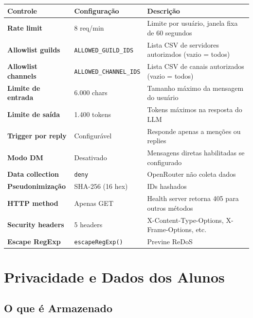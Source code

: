 \documentclass[11pt,a4paper]{article}
\begin{document}
\begin{longtable}{>{\bfseries\color{primary}}l l X}
\toprule
\rowcolor{tableheader}
\color{tableheadertext}\textbf{Controle} & \color{tableheadertext}\textbf{Configura\c{c}\~ao} & \color{tableheadertext}\textbf{Descri\c{c}\~ao} \\
\midrule
\endhead
\rowcolor{tableroweven}
Rate limit & 8 req/min & Limite por usu\'ario, janela fixa de 60 segundos \\
Allowlist guilds & \texttt{ALLOWED\_GUILD\_IDS} & Lista CSV de servidores autorizados (vazio = todos) \\
\rowcolor{tableroweven}
Allowlist channels & \texttt{ALLOWED\_CHANNEL\_IDS} & Lista CSV de canais autorizados (vazio = todos) \\
Limite de entrada & 6.000 chars & Tamanho m\'aximo da mensagem do usu\'ario \\
\rowcolor{tableroweven}
Limite de sa\'ida & 1.400 tokens & Tokens m\'aximos na resposta do LLM \\
Trigger por reply & Configur\'avel & Responde apenas a men\c{c}\~oes ou replies \\
\rowcolor{tableroweven}
Modo DM & Desativado & Mensagens diretas habilitadas se configurado \\
Data collection & \texttt{deny} & OpenRouter n\~ao coleta dados \\
\rowcolor{tableroweven}
Pseudonimiza\c{c}\~ao & SHA-256 (16 hex) & IDs hashados \\
HTTP method & Apenas GET & Health server retorna 405 para outros m\'etodos \\
\rowcolor{tableroweven}
Security headers & 5 headers & X-Content-Type-Options, X-Frame-Options, etc. \\
Escape RegExp & \texttt{escapeRegExp()} & Previne ReDoS \\
\bottomrule
\end{longtable}

\section{Privacidade e Dados dos Alunos}

\subsection{O que é Armazenado}
\end{document}
